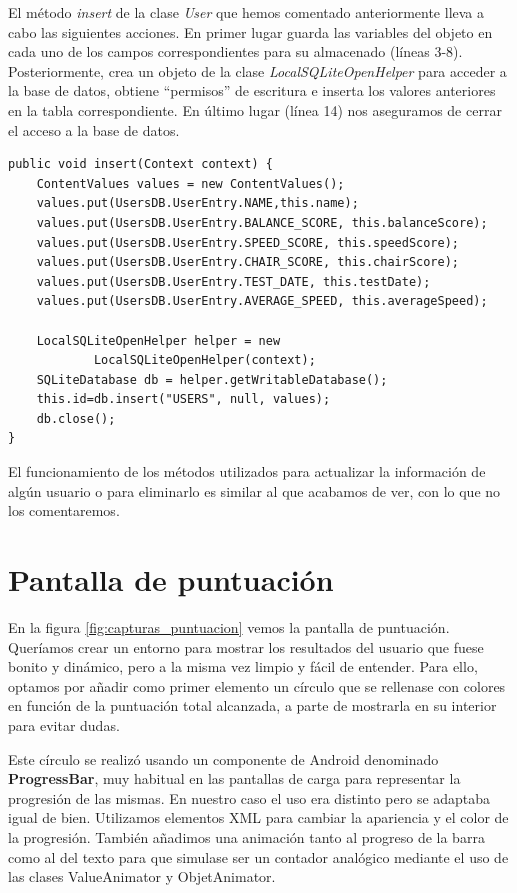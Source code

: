 El método \textit{insert} de la clase \textit{User} que hemos comentado anteriormente lleva a cabo las siguientes acciones. En primer lugar guarda las variables del objeto en cada uno de los campos correspondientes para su almacenado (líneas 3-8). Posteriormente, crea un objeto de la clase \textit{LocalSQLiteOpenHelper} para acceder a la base de datos, obtiene ``permisos'' de escritura e inserta los valores anteriores en la tabla correspondiente. En último lugar (línea 14) nos aseguramos de cerrar el acceso a la base de datos.

\begin{lstlisting}
public void insert(Context context) {
    ContentValues values = new ContentValues();
    values.put(UsersDB.UserEntry.NAME,this.name);
    values.put(UsersDB.UserEntry.BALANCE_SCORE, this.balanceScore);
    values.put(UsersDB.UserEntry.SPEED_SCORE, this.speedScore);
    values.put(UsersDB.UserEntry.CHAIR_SCORE, this.chairScore);
    values.put(UsersDB.UserEntry.TEST_DATE, this.testDate);
    values.put(UsersDB.UserEntry.AVERAGE_SPEED, this.averageSpeed);

    LocalSQLiteOpenHelper helper = new
            LocalSQLiteOpenHelper(context);
    SQLiteDatabase db = helper.getWritableDatabase();
    this.id=db.insert("USERS", null, values);
    db.close();
}
\end{lstlisting}

El funcionamiento de los métodos utilizados para actualizar la información de algún usuario o para eliminarlo es similar al que acabamos de ver, con lo que no los comentaremos. 

\section{Pantalla de puntuación}

En la figura \ref{fig:capturas_puntuacion} vemos la pantalla de puntuación. Queríamos crear un entorno para mostrar los resultados del usuario que fuese bonito y dinámico, pero a la misma vez limpio y fácil de entender. Para ello, optamos por añadir como primer elemento un círculo que se rellenase con colores en función de la puntuación total alcanzada, a parte de mostrarla en su interior para evitar dudas. 

Este círculo se realizó usando un componente de Android denominado \textbf{ProgressBar}, muy habitual en las pantallas de carga para representar la progresión de las mismas. En nuestro caso el uso era distinto pero se adaptaba igual de bien. Utilizamos elementos XML para cambiar la apariencia y el color de la progresión. También añadimos una animación tanto al progreso de la barra como al del texto para que simulase ser un contador analógico mediante el uso de las clases ValueAnimator y ObjetAnimator.

